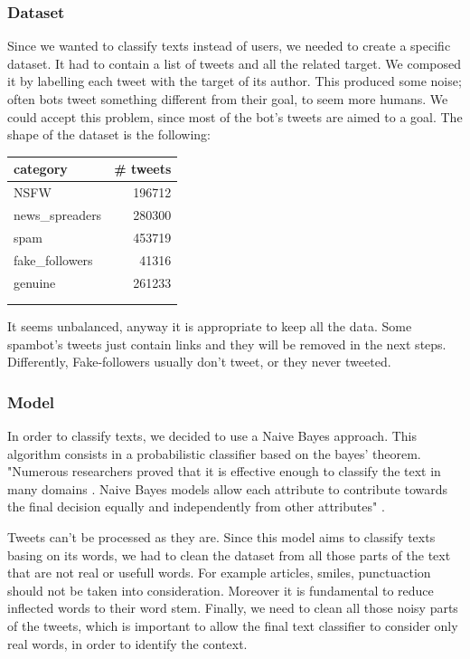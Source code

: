 \subsubsection{Dataset}
Since we wanted to classify texts instead of users, we needed to create a specific dataset.
It had to contain a list of tweets and all the related target. We composed it by labelling each tweet with the target of its author. This produced some noise; often bots tweet something different from their goal, to seem more humans. We could accept this problem, since most of the bot's tweets are aimed to a goal.
The shape of the dataset is the following:

\begin{center}
	\begin{tabular}{lr}
		category&\# tweets\\
		\hline\hline
		NSFW&196712\\
		news\_spreaders&280300\\
		spam&453719\\
		fake\_followers&41316\\
		genuine&261233\\
		\hline\\\\
	\end{tabular}
\end{center}

It seems unbalanced, anyway it is appropriate to keep all the data. Some spambot's tweets just contain links and they will be removed in the next steps. Differently, Fake-followers usually don't tweet, or they never tweeted.

\subsubsection{Model}
In order to classify texts, we decided to use a Naive Bayes approach. This algorithm consists in a probabilistic classifier based on the bayes' theorem. "Numerous researchers proved that it is effective enough to classify the text in many domains \cite{svm}. Naive Bayes models allow each attribute to contribute towards the final decision equally and independently from other attributes" \cite{nb}.

Tweets can't be processed as they are. Since this model aims to classify texts basing on its words, we had to clean the dataset from all those parts of the text that are not real or usefull words. For example articles, smiles, punctuaction should not be taken into consideration. Moreover it is fundamental to reduce inflected words to their word stem. Finally, we need to clean all those noisy parts of the tweets, which is important to allow the final text classifier to consider only real words, in order to identify the context.

